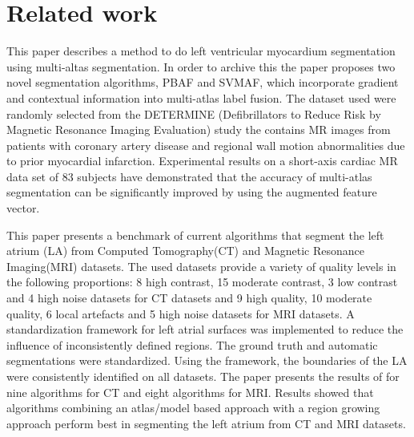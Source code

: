 \documentclass[12pt]{report}
\begin{document}
\chapter{Related work}
This paper \cite{bai1} describes a method to do left ventricular myocardium segmentation using multi-altas segmentation. In order to archive this the paper proposes two novel segmentation algorithms, PBAF and SVMAF, which incorporate gradient and contextual information into multi-atlas label fusion. The dataset used were randomly selected from the DETERMINE (Defibrillators to Reduce Risk by Magnetic Resonance Imaging Evaluation) study the contains MR images from patients with coronary artery disease and regional wall motion abnormalities due to prior myocardial infarction. Experimental results on a short-axis cardiac MR data set of 83 subjects have demonstrated that the accuracy of multi-atlas segmentation can be significantly improved by using the augmented feature vector.

This paper \cite{gomez1} presents a benchmark of current algorithms that segment the left atrium (LA) from  Computed Tomography(CT) and  Magnetic Resonance Imaging(MRI) datasets. The used datasets provide a variety of quality levels in the following proportions: 8 high contrast, 15 moderate contrast, 3 low contrast and 4 high noise datasets for CT datasets  and 9 high quality, 10 moderate quality, 6 local artefacts and 5 high noise datasets for MRI datasets. A standardization framework for left atrial surfaces was implemented  to reduce the influence of inconsistently defined regions. The ground truth and automatic segmentations were standardized. Using the framework, the boundaries of the LA were consistently identified on all datasets. The paper presents the results of  for nine algorithms for CT and eight algorithms for MRI. Results showed that algorithms combining an atlas/model based approach with a region growing approach perform best in segmenting the left atrium from CT and MRI datasets.

\printbibliography
\end{document}
